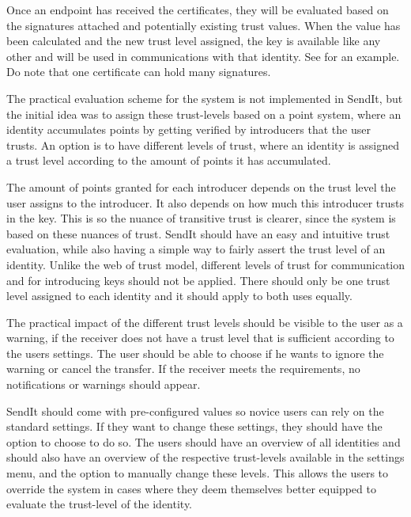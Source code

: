 		Once an endpoint has received the certificates, they will be evaluated based on the signatures attached and potentially existing trust values. When the value has been calculated and the new trust level assigned, the key is available like any other and will be used in communications with that identity. See  for an example. Do note that one certificate can hold many signatures.

		The practical evaluation scheme for the system is not implemented in SendIt, but the initial idea was to assign these trust-levels based on a point system, where an identity accumulates points by getting verified by introducers that the user trusts. An option is to have different levels of trust, where an identity is assigned a trust level according to the amount of points it has accumulated.

		The amount of points granted for each introducer depends on the trust level the user assigns to the introducer. It also depends on how much this introducer trusts in the key. This is so the nuance of transitive trust is clearer, since the system is based on these nuances of trust. SendIt should have an easy and intuitive trust evaluation, while also having a simple way to fairly assert the trust level of an identity. Unlike the web of trust model, different levels of trust for communication and for introducing keys should not be applied. There should only be one trust level assigned to each identity and it should apply to both uses equally.

		The practical impact of the different trust levels should be visible to the user as a warning, if the receiver does not have a trust level that is sufficient according to the users settings. The user should be able to choose if he wants to ignore the warning or cancel the transfer. If the receiver meets the requirements, no notifications or warnings should appear.

		SendIt should come with pre-configured values so novice users can rely on the standard settings. If they want to change these settings, they should have the option to choose to do so. The users should have an overview of all identities and should also have an overview of the respective trust-levels available in the settings menu, and the option to manually change these levels. This allows the users to override the system in cases where they deem themselves better equipped to evaluate the trust-level of the identity.

